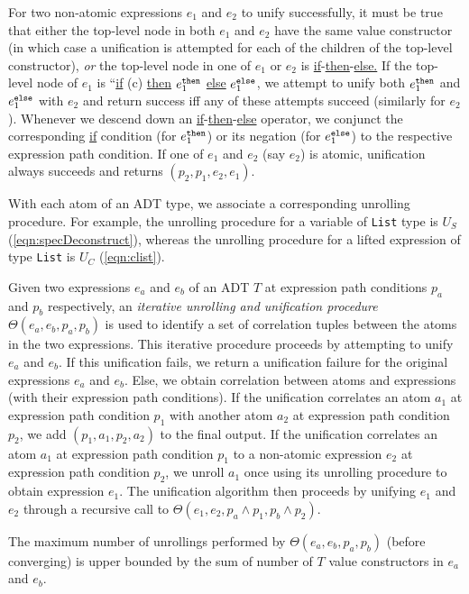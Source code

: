 For two non-atomic expressions $e_1$
and $e_2$ to unify successfully, it must be true that
either the top-level
node in both $e_1$ and $e_2$ have the same
value constructor (in which case a unification is attempted
for each of the children of the top-level constructor),
{\em or} the top-level node in one of $e_1$ or $e_2$
is \underline{if}-\underline{then}-\underline{else.} If
the top-level node of $e_1$ is ``\underline{if} (c) \underline{then} $e^{\tt then}_1$ \underline{else} $e^{\tt else}_1$,
we attempt to unify both $e^{\tt then}_1$ and $e^{\tt else}_1$ with $e_2$ and
return success iff any of these attempts succeed (similarly for $e_2$).
Whenever we descend down an \underline{if}-\underline{then}-\underline{else} operator,
we conjunct the corresponding \underline{if} condition (for $e_1^{\tt then}$) or
its negation (for $e_1^{\tt else}$) to the respective
expression path condition. If one of
$e_1$ and $e_2$ (say $e_2$) is atomic, unification always succeeds and
returns $(p_2,p_1,e_2,e_1)$.

With each atom of an ADT type, we associate a corresponding unrolling procedure.
For example, the unrolling procedure for a \SpecL{} variable of {\tt List}
type is $U_S$ (\cref{eqn:specDeconstruct}),
whereas the unrolling procedure for a lifted expression
of type {\tt List} is $U_C$ (\cref{eqn:clist}).

Given two expressions $e_a$ and $e_b$
of an ADT $T$ at expression path conditions $p_a$ and $p_b$
respectively, an {\em iterative
unrolling and unification procedure} $\Theta(e_a,e_b,p_a,p_b)$ is used
to identify a set of correlation tuples between the
atoms in the two expressions.
This
iterative procedure
proceeds by attempting
to unify $e_a$ and $e_b$. If this unification
fails, we return a unification failure
for the original expressions $e_a$ and $e_b$. Else, we obtain
correlation between atoms and
expressions (with their expression path conditions). If the unification
correlates an atom $a_1$ at expression path condition $p_1$
with another atom $a_2$ at expression path condition $p_2$, we add $(p_1,a_1,p_2,a_2)$
to the final output.  If the unification correlates
an atom $a_1$ at expression
path condition $p_1$ to a non-atomic expression $e_2$ at
expression path condition $p_2$,
we unroll $a_1$ once using its unrolling procedure to
obtain expression $e_1$. The unification algorithm
then proceeds by unifying $e_1$ and $e_2$ through
a recursive call to $\Theta(e_1,e_2,p_a\land{}p_1,p_b\land{}p_2)$.

The maximum number of unrollings performed by
$\Theta(e_a,e_b,p_a,p_b)$ (before converging)
is upper bounded by the sum of number of $T$ value
constructors in $e_a$ and $e_b$.

